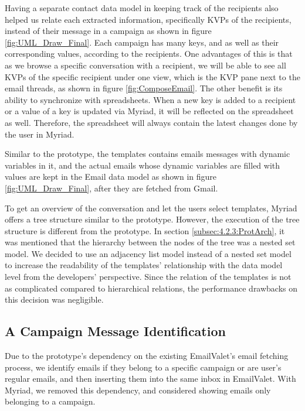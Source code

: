 Having a separate contact data model in keeping track of the recipients also helped us relate each extracted information, specifically \ac{KVP}s of the recipients, instead of their message in a campaign as shown in figure \ref{fig:UML_Draw_Final}. Each campaign has many keys, and as well as their corresponding values, according to the recipients. One advantages of this is that as we browse a specific conversation with a recipient, we will be able to see all \ac{KVP}s of the specific recipient under one view, which is the \ac{KVP} pane next to the email threads, as shown in figure \ref{fig:ComposeEmail}. The other benefit is its ability to synchronize with spreadsheets. When a new key is added to a recipient or a value of a key is updated via Myriad, it will be reflected on the spreadsheet as well. Therefore, the spreadsheet will always contain the latest changes done by the user in Myriad. 
\vspace{1cm}

Similar to the prototype, the templates contains emails messages with dynamic variables in it, and the actual emails whose dynamic variables are filled with values are kept in the Email data model as shown in figure \ref{fig:UML_Draw_Final}, after they are fetched from Gmail.
\vspace{1cm}

To get an overview of the conversation and let the users select templates, Myriad offers a tree structure similar to the prototype. However, the execution of the tree structure is different from the prototype. In section \ref{subsec:4.2.3:ProtArch}, it was mentioned that the hierarchy between the nodes of the tree was a nested set model. We decided to use an adjacency list model instead of a nested set model to increase the readability of the templates' relationship with the data model level from the developers' perspective. Since the relation of the templates is not as complicated compared to hierarchical relations, the performance drawbacks on this decision was negligible.

\subsection{A Campaign Message Identification}
\label{subsec:5.3.3:MessIden}

Due to the prototype's dependency on the existing EmailValet's email fetching process, we identify emails if they belong to a specific campaign or are user's regular emails, and then inserting them into the same inbox in EmailValet. With Myriad, we removed this dependency, and considered showing emails only belonging to a campaign.
\vspace{1cm}

